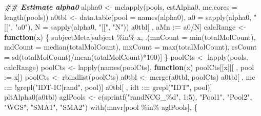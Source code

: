 \documentclass[11pt,letterpaper,oneside]{book}
\newenvironment{Shaded}{\begin{snugshade}}{\end{snugshade}}
\newcommand{\AttributeTok}[1]{\textcolor[rgb]{0.77,0.63,0.00}{#1}}
\newcommand{\ControlFlowTok}[1]{\textcolor[rgb]{0.13,0.29,0.53}{\textbf{#1}}}
\newcommand{\DecValTok}[1]{\textcolor[rgb]{0.00,0.00,0.81}{#1}}
\newcommand{\DocumentationTok}[1]{\textcolor[rgb]{0.56,0.35,0.01}{\textbf{\textit{#1}}}}
\newcommand{\ErrorTok}[1]{\textcolor[rgb]{0.64,0.00,0.00}{\textbf{#1}}}
\newcommand{\FunctionTok}[1]{\textcolor[rgb]{0.00,0.00,0.00}{#1}}
\newcommand{\NormalTok}[1]{#1}
\newcommand{\OtherTok}[1]{\textcolor[rgb]{0.56,0.35,0.01}{#1}}
\newcommand{\SpecialCharTok}[1]{\textcolor[rgb]{0.00,0.00,0.00}{#1}}
\newcommand{\StringTok}[1]{\textcolor[rgb]{0.31,0.60,0.02}{#1}}
\begin{document}
\begin{Shaded}
\begin{Highlighting}[]
\DocumentationTok{\#\# Estimate alpha0}
\NormalTok{alpha0 }\OtherTok{\textless{}{-}} \FunctionTok{mclapply}\NormalTok{(pools, estAlpha0, }\AttributeTok{mc.cores =} \FunctionTok{length}\NormalTok{(pools))}
\NormalTok{a0tbl }\OtherTok{\textless{}{-}} \FunctionTok{data.table}\NormalTok{(}\AttributeTok{pool =} \FunctionTok{names}\NormalTok{(alpha0),}
                    \AttributeTok{a0 =} \FunctionTok{sapply}\NormalTok{(alpha0, }\StringTok{"[["}\NormalTok{, }\StringTok{"a0"}\NormalTok{),}
                    \AttributeTok{N =} \FunctionTok{sapply}\NormalTok{(alpha0, }\StringTok{"[["}\NormalTok{, }\StringTok{"N"}\NormalTok{))}
\NormalTok{a0tbl[ , aMn }\SpecialCharTok{:}\ErrorTok{=}\NormalTok{ a0}\SpecialCharTok{/}\NormalTok{N]}
\NormalTok{calcRange }\OtherTok{\textless{}{-}} \ControlFlowTok{function}\NormalTok{(x) \{}
\NormalTok{  subjectMeta[subject }\SpecialCharTok{\%in\%}\NormalTok{ x,}
\NormalTok{              .(}\AttributeTok{mnCount =} \FunctionTok{min}\NormalTok{(totalMolCount),}
                \AttributeTok{mdCount =} \FunctionTok{median}\NormalTok{(totalMolCount),}
                \AttributeTok{mxCount =} \FunctionTok{max}\NormalTok{(totalMolCount),}
                \AttributeTok{rsCount =} \FunctionTok{sd}\NormalTok{(totalMolCount)}\SpecialCharTok{/}\FunctionTok{mean}\NormalTok{(totalMolCount)}\SpecialCharTok{*}\DecValTok{100}\NormalTok{)]}
\NormalTok{\}}
\NormalTok{poolCts }\OtherTok{\textless{}{-}} \FunctionTok{lapply}\NormalTok{(pools, calcRange)}
\NormalTok{poolCts }\OtherTok{\textless{}{-}} \FunctionTok{lapply}\NormalTok{(}\FunctionTok{names}\NormalTok{(poolCts), }\ControlFlowTok{function}\NormalTok{(x) poolCts[[x]][ , }\AttributeTok{pool :=}\NormalTok{ x])}
\NormalTok{poolCts }\OtherTok{\textless{}{-}} \FunctionTok{rbindlist}\NormalTok{(poolCts)}
\NormalTok{a0tbl }\OtherTok{\textless{}{-}} \FunctionTok{merge}\NormalTok{(a0tbl, poolCts)}
\NormalTok{a0tbl[ , mc }\SpecialCharTok{:}\ErrorTok{=} \SpecialCharTok{!}\FunctionTok{grepl}\NormalTok{(}\StringTok{"IDT{-}IC|rand"}\NormalTok{, pool)]}
\NormalTok{a0tbl[ , idt }\SpecialCharTok{:}\ErrorTok{=} \FunctionTok{grepl}\NormalTok{(}\StringTok{"IDT"}\NormalTok{, pool)]}
\FunctionTok{pltAlpha0}\NormalTok{(a0tbl)}
\NormalTok{aglPools }\OtherTok{\textless{}{-}} \FunctionTok{c}\NormalTok{(}\FunctionTok{sprintf}\NormalTok{(}\StringTok{"randNCG\_\%d"}\NormalTok{, }\DecValTok{1}\SpecialCharTok{:}\DecValTok{5}\NormalTok{), }\StringTok{"Pool1"}\NormalTok{, }\StringTok{"Pool2"}\NormalTok{, }\StringTok{"WGS"}\NormalTok{, }\StringTok{"SMA1"}\NormalTok{, }\StringTok{"SMA2"}\NormalTok{)}
\FunctionTok{with}\NormalTok{(mnvr[pool }\SpecialCharTok{\%in\%}\NormalTok{ aglPools], \{}

\end{Highlighting}
\end{Shaded}
\end{document}
